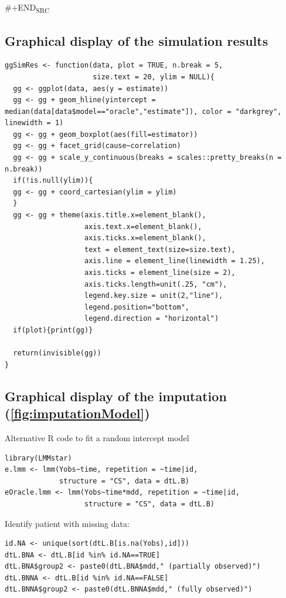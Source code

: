 \documentclass[12pt]{article}
\begin{document}
\#+END\textsubscript{SRC}

\subsection{Graphical display of the simulation results}
\label{sec:org8778932}

\lstset{language=r,label= ,caption= ,captionpos=b,numbers=none}
\begin{lstlisting}
ggSimRes <- function(data, plot = TRUE, n.break = 5,
                     size.text = 20, ylim = NULL){
  gg <- ggplot(data, aes(y = estimate))
  gg <- gg + geom_hline(yintercept = median(data[data$model=="oracle","estimate"]), color = "darkgrey", linewidth = 1)
  gg <- gg + geom_boxplot(aes(fill=estimator))
  gg <- gg + facet_grid(cause~correlation)
  gg <- gg + scale_y_continuous(breaks = scales::pretty_breaks(n = n.break))
  if(!is.null(ylim)){
  gg <- gg + coord_cartesian(ylim = ylim)
  }
  gg <- gg + theme(axis.title.x=element_blank(),
                   axis.text.x=element_blank(),
                   axis.ticks.x=element_blank(),
                   text = element_text(size=size.text),
                   axis.line = element_line(linewidth = 1.25),
                   axis.ticks = element_line(size = 2),
                   axis.ticks.length=unit(.25, "cm"),
                   legend.key.size = unit(2,"line"),
                   legend.position="bottom",
                   legend.direction = "horizontal")
  if(plot){print(gg)}
  
  return(invisible(gg))
}
\end{lstlisting}

\subsection{Graphical display of the imputation (\autoref{fig:imputationModel})}
\label{SM:imputation}
Alternative R code to fit a random intercept model
\lstset{language=r,label= ,caption= ,captionpos=b,numbers=none}
\begin{lstlisting}
library(LMMstar)
e.lmm <- lmm(Yobs~time, repetition = ~time|id,
             structure = "CS", data = dtL.B)
eOracle.lmm <- lmm(Yobs~time*mdd, repetition = ~time|id,
                   structure = "CS", data = dtL.B)
\end{lstlisting}

Identify patient with missing data:
\lstset{language=r,label= ,caption= ,captionpos=b,numbers=none}
\begin{lstlisting}
id.NA <- unique(sort(dtL.B[is.na(Yobs),id]))
dtL.BNA <- dtL.B[id %in% id.NA==TRUE]
dtL.BNA$group2 <- paste0(dtL.BNA$mdd," (partially observed)")
dtL.BNNA <- dtL.B[id %in% id.NA==FALSE]
dtL.BNNA$group2 <- paste0(dtL.BNNA$mdd," (fully observed)")
\end{lstlisting}
\end{document}
